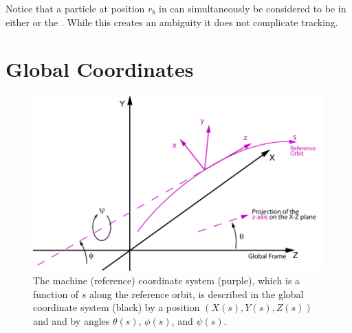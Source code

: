 Notice that a particle at position $r_b$ in  can simultaneously be considered to
be in either  or the . While this creates an ambiguity it does not complicate
tracking.

\section{Global Coordinates}
\label{s:global}

\begin{figure}[tb]
  \centering
  \includegraphics{global-coords.pdf}
  \caption[The Global Coordinate System]{
The machine (reference) coordinate system (purple), which is a function of $s$ along the reference
orbit, is described in the global coordinate system (black) by a position $(X(s), Y(s), Z(s))$ and
and by angles $\theta(s)$, $\phi(s)$, and $\psi(s)$.
  }
  \label{f:global.coords}
\end{figure}

